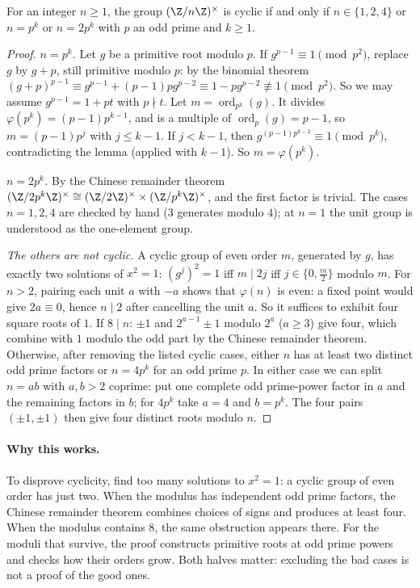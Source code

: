\begin{theorem}\label{thm:cyclicn}
For an integer $n\ge1$, the group $(\Z/n\Z)^\times$ is cyclic if and only if $n\in\{1,2,4\}$ or $n=p^k$ or $n=2p^k$ with $p$ an odd prime and $k\ge1$.
\end{theorem}
\begin{proof}
\emph{$n=p^k$.} Let $g$ be a primitive root modulo $p$. If $g^{p-1}\equiv1\pmod{p^2}$, replace $g$ by $g+p$, still primitive modulo $p$: by the binomial theorem $(g+p)^{p-1}\equiv g^{p-1}+(p-1)pg^{p-2}\equiv1-pg^{p-2}\not\equiv1\pmod{p^2}$. So we may assume $g^{p-1}=1+pt$ with $p\nmid t$. Let $m=\operatorname{ord}_{p^k}(g)$. It divides $\varphi(p^k)=(p-1)p^{k-1}$, and is a multiple of $\operatorname{ord}_p(g)=p-1$, so $m=(p-1)p^j$ with $j\le k-1$. If $j<k-1$, then $g^{(p-1)p^{k-2}}\equiv1\pmod{p^k}$, contradicting the lemma (applied with $k-1$). So $m=\varphi(p^k)$.

\emph{$n=2p^k$.} By the Chinese remainder theorem $(\Z/2p^k\Z)^\times\cong(\Z/2\Z)^\times\times(\Z/p^k\Z)^\times$, and the first factor is trivial. The cases $n=1,2,4$ are checked by hand ($3$ generates modulo $4$); at $n=1$ the unit group is understood as the one-element group.

\emph{The others are not cyclic.} A cyclic group of even order $m$, generated by $g$, has exactly two solutions of $x^2=1$: $(g^j)^2=1$ iff $m\mid2j$ iff $j\in\{0,\frac m2\}$ modulo $m$. For $n>2$, pairing each unit $a$ with $-a$ shows that $\varphi(n)$ is even: a fixed point would give $2a\equiv0$, hence $n\mid2$ after cancelling the unit $a$. So it suffices to exhibit four square roots of $1$. If $8\mid n$: $\pm1$ and $2^{a-1}\pm1$ modulo $2^a$ ($a\ge3$) give four, which combine with $1$ modulo the odd part by the Chinese remainder theorem. Otherwise, after removing the listed cyclic cases, either $n$ has at least two distinct odd prime factors or $n=4p^k$ for an odd prime $p$. In either case we can split $n=ab$ with $a,b>2$ coprime: put one complete odd prime-power factor in $a$ and the remaining factors in $b$; for $4p^k$ take $a=4$ and $b=p^k$. The four pairs $(\pm1,\pm1)$ then give four distinct roots modulo $n$.
\end{proof}

\paragraph{Why this works.}
To disprove cyclicity, find too many solutions to $x^2=1$: a cyclic group of even order has just two. When the modulus has independent odd prime factors, the Chinese remainder theorem combines choices of signs and produces at least four. When the modulus contains $8$, the same obstruction appears there. For the moduli that survive, the proof constructs primitive roots at odd prime powers and checks how their orders grow. Both halves matter: excluding the bad cases is not a proof of the good ones.

